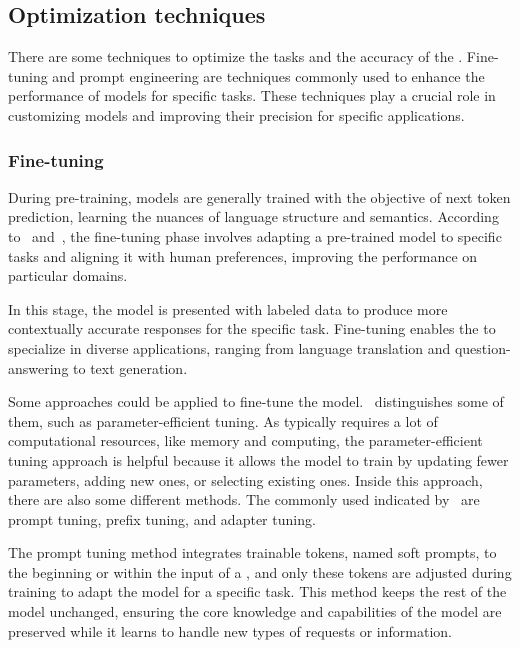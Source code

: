 \subsection{Optimization techniques}

There are some techniques to optimize the tasks and the accuracy of the {\llm}. Fine-tuning and prompt engineering are techniques commonly used to enhance the performance of models for specific tasks. These techniques play a crucial role in customizing models and improving their precision for specific applications.


\subsubsection{Fine-tuning}

During pre-training, models are generally trained with the objective of next token prediction, learning the nuances of language structure and semantics. According to~\citet{kamnis_generative_2023} and~\citet{hadi_LLM_2023}, the fine-tuning phase involves adapting a pre-trained model to specific tasks and aligning it with human preferences, improving the performance on particular domains.

In this stage, the model is presented with labeled data to produce more contextually accurate responses for the specific task. Fine-tuning enables the {\llm} to specialize in diverse applications, ranging from language translation and question-answering to text generation. 

Some approaches could be applied to fine-tune the model.~\citet{naveed_comprehensive_2023} distinguishes some of them, such as parameter-efficient tuning. As {\llm} typically requires a lot of computational resources, like memory and computing, the parameter-efficient tuning approach is helpful because it allows the model to train by updating fewer parameters, adding new ones, or selecting existing ones. Inside this approach, there are also some different methods. The commonly used indicated by~\citet{naveed_comprehensive_2023} are prompt tuning, prefix tuning, and adapter tuning.

The prompt tuning method integrates trainable tokens, named soft prompts, to the beginning or within the input of a {\llm}, and only these tokens are adjusted during training to adapt the model for a specific task. This method keeps the rest of the model unchanged, ensuring the core knowledge and capabilities of the model are preserved while it learns to handle new types of requests or information.

